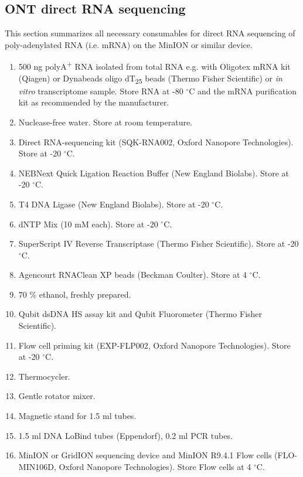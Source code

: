 \documentclass[times, 11pt, a4paper]{article}
\begin{document}
\subsection*{ONT direct RNA sequencing}
This section summarizes all necessary consumables for direct RNA sequencing of poly-adenylated RNA (i.e. mRNA) on the MinION or similar device.
\begin{enumerate}
\item 500 ng polyA\textsuperscript{+} RNA isolated from total RNA e.g. with Oligotex mRNA kit (Qiagen) or Dynabeads oligo dT\textsubscript{25} beads (Thermo Fisher Scientific) or \emph{in vitro} transcriptome sample. Store RNA at -80 $^{\circ}$C and the mRNA purification kit as recommended by the manufacturer.

\item Nuclease-free water. Store at room temperature.

\item Direct RNA-sequencing kit (SQK-RNA002, Oxford Nanopore Technologies). Store at -20 $^{\circ}$C.

\item NEBNext Quick Ligation Reaction Buffer (New England Biolabs). Store at -20 $^{\circ}$C.

\item T4 DNA Ligase (New England Biolabs). Store at -20 $^{\circ}$C.

\item dNTP Mix (10 mM each). Store at -20 $^{\circ}$C.

\item SuperScript IV Reverse Transcriptase (Thermo Fisher Scientific). Store at -20 $^{\circ}$C.

\item Agencourt RNAClean XP beads (Beckman Coulter). Store at 4 $^{\circ}$C.

\item 70 \% ethanol, freshly prepared. 

\item Qubit dsDNA HS assay kit and Qubit Fluorometer (Thermo Fisher Scientific).

\item Flow cell priming kit (EXP-FLP002, Oxford Nanopore Technologies). Store at -20 $^{\circ}$C.

\item Thermocycler.

\item Gentle rotator mixer.

\item Magnetic stand for 1.5 ml tubes.

\item 1.5 ml DNA LoBind tubes (Eppendorf), 0.2  ml PCR tubes.

\item MinION or GridION sequencing device and MinION R9.4.1 Flow cells (FLO-MIN106D, Oxford Nanopore Technologies). Store Flow cells at 4 $^{\circ}$C.
\end{enumerate}
\end{document}
